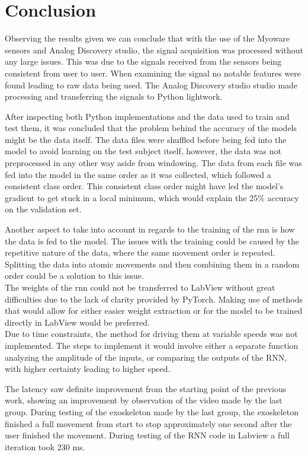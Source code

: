 \section{Conclusion}
Observing the results given we can conclude that with the use of the Myoware sensors and Analog Discovery studio, the signal 
acquisition was processed without any large issues. This was due to the signals received from the sensors being consistent 
from user to user. When examining the signal no notable features were found leading to raw data being used.
The Analog Discovery studio studio made processing and transferring the signals to Python lightwork.


After inspecting both Python implementations and the data used to train and test them, it was concluded that the problem behind the accuracy
of the models might be the data itself. The data files were shuffled before being fed into the model to avoid learning on the test subject
itself, however, the data was not preprocessed in any other way aside from windowing. The data from each file was fed into the model in the 
same order as it was collected, which followed a consistent class order. This consistent class order might have led the model's gradient to 
get stuck in a local minimum, which would explain the 25\% accuracy on the validation set.

Another aspect to take into account in regards to the training of the \acrshort{rnn} is how the data is fed to the model. The issues
with the training could be caused by the repetitive nature of the data, where the same movement order is repeated. Splitting the data
into atomic movements and then combining them in a random order could be a solution to this issue.
\\

The weights of the \acrshort{rnn} could not be transferred to LabView without great difficulties due to the lack of clarity provided by
PyTorch. Making use of methods that would allow for either easier weight extraction or for the model to be trained
directly in LabView would be preferred.
\\

Due to time constraints, the method for driving them at variable speeds was not implemented. The steps to implement it
would involve either a separate function analyzing the amplitude of the inputs, or comparing the outputs of the RNN,
with higher certainty leading to higher speed.


The latency saw definite improvement from the starting point of the previous work, showing an improvement by observation of the video made by the last group. During testing of the exoskeleton made by the last group,
the exoskeleton finished a full movement from start to stop approximately one second after the user finished the movement. During testing of the RNN code in Labview a full iteration took 230 ms.


